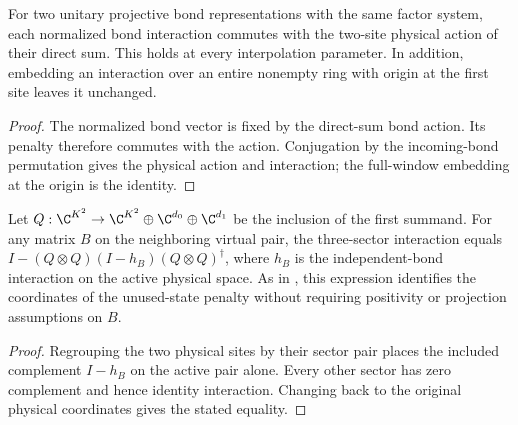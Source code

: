 \begin{lemma}
    \label{thm:spt_normalized_bond_local_symmetry}
    \leanok

    For two unitary projective bond representations with the same factor
    system, each normalized bond interaction commutes with the two-site
    physical action of their direct sum. This holds at every interpolation
    parameter. In addition, embedding an interaction over an entire
    nonempty ring with origin at the first site leaves it unchanged.
\end{lemma}

\begin{proof}\leanok
    The normalized bond vector is fixed by the direct-sum bond action.
    Its penalty therefore commutes with the action. Conjugation by the
    incoming-bond permutation gives the physical action and interaction;
    the full-window embedding at the origin is the identity.
\end{proof}

\begin{lemma}
    \label{thm:spt_spectator_bond_transport}
    \leanok
    Let $Q:\C^{K^2}\to\C^{K^2}\oplus\C^{d_0}\oplus\C^{d_1}$
    be the inclusion of the first summand. For any matrix $B$ on the
    neighboring virtual pair, the three-sector interaction equals
    $I-(Q\otimes Q)(I-h_B)(Q\otimes Q)^\dagger$, where
    $h_B$ is the independent-bond interaction on the active physical space.
    As in \cite[Section~II.F.2]{Schuch2011Phases}, this expression
    identifies the coordinates of the unused-state penalty without
    requiring positivity or projection assumptions on $B$.
\end{lemma}

\begin{proof}\leanok
    Regrouping the two physical sites by their sector pair places the
    included complement $I-h_B$ on the active pair alone. Every other sector
    has zero complement and hence identity interaction. Changing back
    to the original physical coordinates gives the stated equality.
\end{proof}

